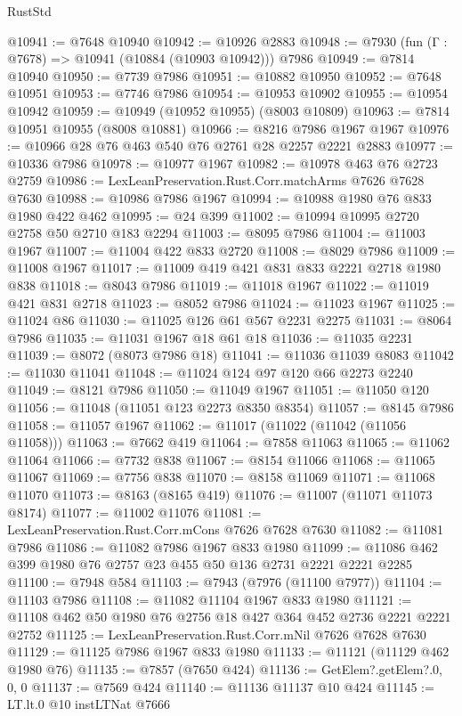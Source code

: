 \begin{lexlean}{RustStd}
\begin{coremodule}
@10941 := @7648 @10940
@10942 := @10926 @2883
@10948 := @7930 (fun (Γ : @7678) => @10941 (@10884 (@10903 @10942))) @7986
@10949 := @7814 @10940
@10950 := @7739 @7986
@10951 := @10882 @10950
@10952 := @7648 @10951
@10953 := @7746 @7986
@10954 := @10953 @10902
@10955 := @10954 @10942
@10959 := @10949 (@10952 @10955) (@8003 @10809)
@10963 := @7814 @10951 @10955 (@8008 @10881)
@10966 := @8216 @7986 @1967 @1967
@10976 := @10966 @28 @76 @463 @540 @76 @2761 @28 @2257 @2221 @2883
@10977 := @10336 @7986
@10978 := @10977 @1967
@10982 := @10978 @463 @76 @2723 @2759
@10986 := LexLeanPreservation.Rust.Corr.matchArms @7626 @7628 @7630
@10988 := @10986 @7986 @1967
@10994 := @10988 @1980 @76 @833 @1980 @422 @462
@10995 := @24 @399
@11002 := @10994 @10995 @2720 @2758 @50 @2710 @183 @2294
@11003 := @8095 @7986
@11004 := @11003 @1967
@11007 := @11004 @422 @833 @2720
@11008 := @8029 @7986
@11009 := @11008 @1967
@11017 := @11009 @419 @421 @831 @833 @2221 @2718 @1980 @838
@11018 := @8043 @7986
@11019 := @11018 @1967
@11022 := @11019 @421 @831 @2718
@11023 := @8052 @7986
@11024 := @11023 @1967
@11025 := @11024 @86
@11030 := @11025 @126 @61 @567 @2231 @2275
@11031 := @8064 @7986
@11035 := @11031 @1967 @18 @61 @18
@11036 := @11035 @2231
@11039 := @8072 (@8073 @7986 @18)
@11041 := @11036 @11039 @8083
@11042 := @11030 @11041
@11048 := @11024 @124 @97 @120 @66 @2273 @2240
@11049 := @8121 @7986
@11050 := @11049 @1967
@11051 := @11050 @120
@11056 := @11048 (@11051 @123 @2273 @8350 @8354)
@11057 := @8145 @7986
@11058 := @11057 @1967
@11062 := @11017 (@11022 (@11042 (@11056 @11058)))
@11063 := @7662 @419
@11064 := @7858 @11063
@11065 := @11062 @11064
@11066 := @7732 @838
@11067 := @8154 @11066
@11068 := @11065 @11067
@11069 := @7756 @838
@11070 := @8158 @11069
@11071 := @11068 @11070
@11073 := @8163 (@8165 @419)
@11076 := @11007 (@11071 @11073 @8174)
@11077 := @11002 @11076
@11081 := LexLeanPreservation.Rust.Corr.mCons @7626 @7628 @7630
@11082 := @11081 @7986
@11086 := @11082 @7986 @1967 @833 @1980
@11099 := @11086 @462 @399 @1980 @76 @2757 @23 @455 @50 @136 @2731 @2221 @2221 @2285
@11100 := @7948 @584
@11103 := @7943 (@7976 (@11100 @7977))
@11104 := @11103 @7986
@11108 := @11082 @11104 @1967 @833 @1980
@11121 := @11108 @462 @50 @1980 @76 @2756 @18 @427 @364 @452 @2736 @2221 @2221 @2752
@11125 := LexLeanPreservation.Rust.Corr.mNil @7626 @7628 @7630
@11129 := @11125 @7986 @1967 @833 @1980
@11133 := @11121 (@11129 @462 @1980 @76)
@11135 := @7857 (@7650 @424)
@11136 := GetElem?.getElem?.{0, 0, 0}
@11137 := @7569 @424
@11140 := @11136 @11137 @10 @424
@11145 := LT.lt.{0} @10 instLTNat @7666

\end{coremodule}
\end{lexlean}
